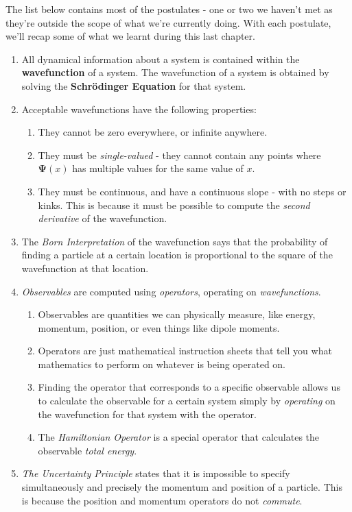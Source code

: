 \documentclass{memoir}[11pt,oneside,a4paper,openany]
\newcommand{\wf}{\ensuremath{\bm{\Psi}}\xspace}
\begin{document}
The list below contains most of the postulates - one or two we haven't met as they're outside the scope of what we're currently doing. With each postulate, we'll recap some of what we learnt during this last chapter.

\begin{enumerate}
	\item All dynamical information about a system is contained within the \textbf{wavefunction} of a system. The wavefunction of a system is obtained by solving the \textbf{Schr{\"o}dinger Equation} for that system.
	\item Acceptable wavefunctions have the following properties:
		\begin{enumerate}
			\item They cannot be zero everywhere, or infinite anywhere.
			\item They must be \emph{single-valued} - they cannot contain any points where $\wf(x)$ has multiple values for the same value of $x$.
			\item They must be continuous, and have a continuous slope - with no steps or kinks. This is because it must be possible to compute the \emph{second derivative} of the wavefunction.
		\end{enumerate}
	
	\item The \emph{Born Interpretation} of the wavefunction says that the probability of finding a particle at a certain location is proportional to the square of the wavefunction at that location. 

	\item \emph{Observables} are computed using \emph{operators}, operating on \emph{wavefunctions}. 
		\begin{enumerate}
			\item Observables are quantities we can physically measure, like energy, momentum, position, or even things like dipole moments.
			\item Operators are just mathematical instruction sheets that tell you what mathematics to perform on whatever is being operated on.
			\item Finding the operator that corresponds to a specific observable allows us to calculate the observable for a certain system simply by \emph{operating} on the wavefunction for that system with the operator.
			\item The \emph{Hamiltonian Operator} is a special operator that calculates the observable \emph{total energy}.
		\end{enumerate}
	\item \emph{The Uncertainty Principle} states that it is impossible to specify simultaneously and precisely the momentum and position of a particle. This is because the position and momentum operators do not \emph{commute}.
\end{enumerate}
\end{document}
